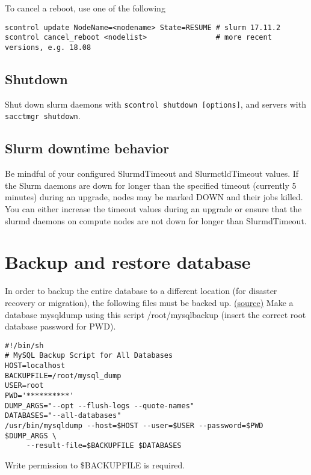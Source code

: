 To cancel a reboot, use one of the following

\begin{verbatim}
scontrol update NodeName=<nodename> State=RESUME # slurm 17.11.2
scontrol cancel_reboot <nodelist>                # more recent versions, e.g. 18.08
\end{verbatim}

\subsection{Shutdown} \label{subsec:slurmshutdown}

Shut down slurm daemons with \texttt{scontrol shutdown [options]}, and servers with \texttt{sacctmgr shutdown}.

\subsection{Slurm downtime behavior} \label{subsec:slurmdowntime}
Be mindful of your configured SlurmdTimeout and SlurmctldTimeout values. If the Slurm daemons are down for longer than the specified timeout (currently 5 minutes) during an upgrade, nodes may be marked DOWN and their jobs killed. You can either increase the timeout values during an upgrade or ensure that the slurmd daemons on compute nodes are not down for longer than SlurmdTimeout. 

\section{Backup and restore database} \label{sec:slurmDBbackup}

In order to backup the entire database to a different location (for disaster recovery or migration), the following files must be backed up. \href{https://wiki.fysik.dtu.dk/niflheim/Slurm_database#backup-and-restore-of-database}{(source)} Make a database mysqldump using this script /root/mysqlbackup (insert the correct root database password for PWD). 

\begin{verbatim}
#!/bin/sh
# MySQL Backup Script for All Databases
HOST=localhost
BACKUPFILE=/root/mysql_dump
USER=root
PWD='**********'
DUMP_ARGS="--opt --flush-logs --quote-names"
DATABASES="--all-databases"
/usr/bin/mysqldump --host=$HOST --user=$USER --password=$PWD $DUMP_ARGS \
     --result-file=$BACKUPFILE $DATABASES
\end{verbatim}

Write permission to \$BACKUPFILE is required.

